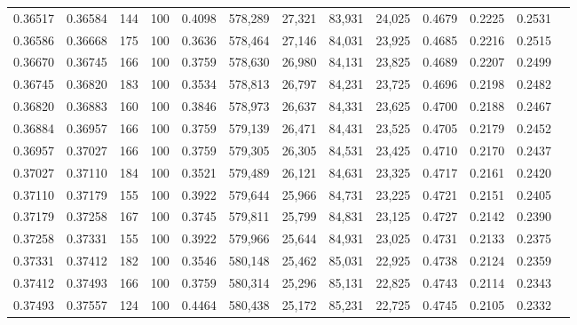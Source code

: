 \begin{tabular}{rrrrrrrrrrrrr}
0.36517 & 0.36584 &   144 & 100 &                                     0.4098 & 578,289 &  27,321 &  83,931 &  24,025 & 0.4679 & 0.2225 & 0.2531 \\
0.36586 & 0.36668 &   175 & 100 &                                     0.3636 & 578,464 &  27,146 &  84,031 &  23,925 & 0.4685 & 0.2216 & 0.2515 \\
0.36670 & 0.36745 &   166 & 100 &                                     0.3759 & 578,630 &  26,980 &  84,131 &  23,825 & 0.4689 & 0.2207 & 0.2499 \\
0.36745 & 0.36820 &   183 & 100 &                                     0.3534 & 578,813 &  26,797 &  84,231 &  23,725 & 0.4696 & 0.2198 & 0.2482 \\
0.36820 & 0.36883 &   160 & 100 &                                     0.3846 & 578,973 &  26,637 &  84,331 &  23,625 & 0.4700 & 0.2188 & 0.2467 \\
0.36884 & 0.36957 &   166 & 100 &                                     0.3759 & 579,139 &  26,471 &  84,431 &  23,525 & 0.4705 & 0.2179 & 0.2452 \\
0.36957 & 0.37027 &   166 & 100 &                                     0.3759 & 579,305 &  26,305 &  84,531 &  23,425 & 0.4710 & 0.2170 & 0.2437 \\
0.37027 & 0.37110 &   184 & 100 &                                     0.3521 & 579,489 &  26,121 &  84,631 &  23,325 & 0.4717 & 0.2161 & 0.2420 \\
0.37110 & 0.37179 &   155 & 100 &                                     0.3922 & 579,644 &  25,966 &  84,731 &  23,225 & 0.4721 & 0.2151 & 0.2405 \\
0.37179 & 0.37258 &   167 & 100 &                                     0.3745 & 579,811 &  25,799 &  84,831 &  23,125 & 0.4727 & 0.2142 & 0.2390 \\
0.37258 & 0.37331 &   155 & 100 &                                     0.3922 & 579,966 &  25,644 &  84,931 &  23,025 & 0.4731 & 0.2133 & 0.2375 \\
0.37331 & 0.37412 &   182 & 100 &                                     0.3546 & 580,148 &  25,462 &  85,031 &  22,925 & 0.4738 & 0.2124 & 0.2359 \\
0.37412 & 0.37493 &   166 & 100 &                                     0.3759 & 580,314 &  25,296 &  85,131 &  22,825 & 0.4743 & 0.2114 & 0.2343 \\
0.37493 & 0.37557 &   124 & 100 &                                     0.4464 & 580,438 &  25,172 &  85,231 &  22,725 & 0.4745 & 0.2105 & 0.2332 \\

\end{tabular}
